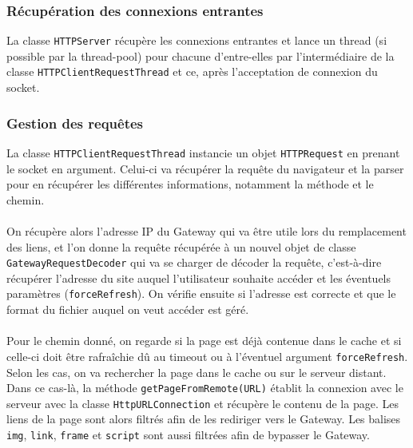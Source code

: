 \documentclass[a4paper,11pt]{article}
\begin{document}
	\subsubsection{Récupération des connexions entrantes}
La classe \texttt{HTTPServer} récupère les connexions entrantes et lance un thread (si possible par la thread-pool) pour chacune d'entre-elles par l'intermédiaire de la classe \texttt{HTTPClientRequestThread} et ce, après l'acceptation de connexion du socket.

	\subsubsection{Gestion des requêtes}
La classe \texttt{HTTPClientRequestThread} instancie un objet \texttt{HTTPRequest} en prenant le socket en argument. Celui-ci va récupérer la requête du navigateur et la parser pour en récupérer les différentes informations, notamment la méthode et le chemin.

\paragraph{}

On récupère alors l'adresse IP du Gateway qui va être utile lors du remplacement des liens, et l'on donne la requête récupérée à un nouvel objet de classe \texttt{GatewayRequestDecoder} qui va se charger de décoder la requête, c'est-à-dire récupérer l'adresse du site auquel l'utilisateur souhaite accéder et les éventuels paramètres (\texttt{forceRefresh}). On vérifie ensuite si l'adresse est correcte et que le format du fichier auquel on veut accéder est géré.

\paragraph{}

Pour le chemin donné, on regarde si la page est déjà contenue dans le cache et si celle-ci doit être rafraîchie dû au timeout ou à l'éventuel argument \texttt{forceRefresh}. Selon les cas, on va rechercher la page dans le cache ou sur le serveur distant. Dans ce cas-là, la méthode \texttt{getPageFromRemote(URL)} établit la connexion avec le serveur avec la classe \texttt{HttpURLConnection} et récupère le contenu de la page. Les liens de la page sont alors filtrés afin de les rediriger vers le Gateway. Les balises \texttt{img}, \texttt{link}, \texttt{frame} et \texttt{script} sont aussi filtrées afin de bypasser le Gateway. 
\end{document}
